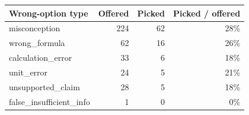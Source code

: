 \begin{tabular}{lrrr}
\toprule
Wrong-option type & Offered & Picked & Picked / offered \\
\midrule
misconception & 224 & 62 & 28\% \\
wrong\_formula & 62 & 16 & 26\% \\
calculation\_error & 33 & 6 & 18\% \\
unit\_error & 24 & 5 & 21\% \\
unsupported\_claim & 28 & 5 & 18\% \\
false\_insufficient\_info & 1 & 0 & 0\% \\
\bottomrule
\end{tabular}
